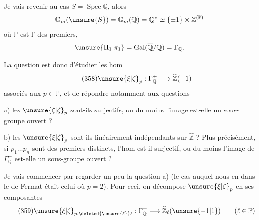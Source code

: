 
Je vais revenir au cas $S=\operatorname{Spec}\mathbb Q$,
alors 
\[
\mathbb G_m(\unsure{S})=\mathbb G_m(\mathbb Q)=\mathbb Q^*
\simeq\{\pm1\}\times\mathbb Z^{(\mathbb P)}
\]
où $\mathbb P$ est l' des  premiers,
\[
\unsure{\Pi_1|\pi_1}=\operatorname{Gal}(\overline{\mathbb Q}/\mathbb Q)=\Gamma_{\mathbb Q}.
\]

La question est donc d'étudier les hom
\[
\tag{358}
\unsure{\xi|\zeta}_p:\Gamma_{\mathbb Q}^{+}\longrightarrow\widehat{\mathbb Z}(-1)
\]
associés aux $p\in\mathbb P$, et de répondre notamment
aux questions

a) les $\unsure{\xi|\zeta}_p$ sont-ils surjectifs, ou du moins l'image
est-elle un sous-groupe ouvert ?

b) les $\unsure{\xi|\zeta}_p$ sont ils linéairement indépendants
sur $\widehat{\mathbb Z}$ ? Plus précisément, si $p_1\ldots p_n$ sont
des  premiers distincts, l'hom
est-il surjectif, ou du moins l'image de
$\Gamma_{\mathbb Q}^{+}$ est-elle un sous-groupe ouvert ?

Je vais commencer par regarder un peu
la question a) (le cas auquel nous en
 dans le  de Fermat était
celui où $p=2$). Pour ceci, on décompose
$\unsure{\xi|\zeta}_p$ en ses composantes
\[
\tag{359}
\unsure{\xi|\zeta}_{p,\deleted{\unsure{\ell}}\ell}:\Gamma_{\mathbb Q}^{+}
\longrightarrow\widehat{\mathbb Z}_{\ell}(\unsure{-1|1})
\qquad(\ell\in\mathbb P)
\]



